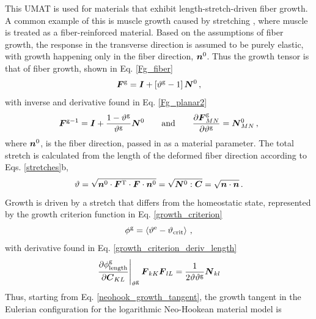 \documentclass[10pt,letterpaper,oneside]{report}
\newcommand{\ten}[1]{\mbox{\boldmath $#1$}{}}
\newcommand{\scas}[1]{\mbox{{\scriptsize{${\rm{#1}}$}}}{}}
\begin{document}
This UMAT is used for materials that exhibit length-stretch-driven fiber growth.  A common example of this is muscle growth caused by stretching \cite{Zollner2012}, where muscle is treated as a fiber-reinforced material.  Based on the assumptions of fiber growth, the response in the transverse direction is assumed to be purely elastic, with growth happening only in the fiber direction, $\ten{n}^0$.  Thus the growth tensor is that of fiber growth, shown in Eq. \ref{Fg_fiber}
\begin{equation*}
\ten{F}^{\scas{g}} = \ten{I} + \left[ \vartheta^{\scas{g}} - 1 \right] \ten{N}^0 \, , 
\end{equation*}
with inverse and derivative found in Eq. \ref{Fg_planar2}
\begin{equation*}
\ten{F}^{\scas{g}-1} = \ten{I} + \frac{1 - \vartheta^{\scas{g}}}{\vartheta^{\scas{g}}} \ten{N}^0 
\qquad \mbox{and} \qquad
\frac{\partial \ten{F}^{\scas{g}}_{MN} }{\partial \vartheta^{\scas{g}}} = \ten{N}^0_{MN} \, , 
\end{equation*}
where $\ten{n}^0$, is the fiber direction, passed in as a material parameter.  
The total stretch is calculated from the length of the deformed fiber direction according to Eqs. \ref{stretches}b, 
\begin{equation*}
\vartheta = \sqrt{ \ten{n}^0 \cdot \ten{F}^{\scas{T}} \cdot \ten{F} \cdot \ten{n}^0} = \sqrt{ \ten{N}^0 : \ten{C} } = \sqrt{ \ten{n} \cdot \ten{n}} \, . 
\label{fiber_stretch}
\end{equation*}
Growth is driven by a stretch that differs from the homeostatic state, represented by the growth criterion function in Eq. \ref{growth_criterion}
\begin{equation*}
\phi^{\scas{g}} = \left\langle \vartheta^{\scas{e}} - \vartheta_{\scas{crit}} \right\rangle \, ,
\end{equation*}
with derivative found in Eq. \ref{growth_criterion_deriv_length}
\begin{equation*}
\left. \frac{ \partial \phi^{\scas{g}}_{\scas{length}} }{ \partial \ten{C}_{KL} } \right|_{\vartheta^{\scas{g}}} \ten{F}_{kK} \ten{F}_{lL} 
= \frac{1}{2 \vartheta \vartheta^{\scas{g}}} \ten{N}_{kl} 
\end{equation*}
Thus, starting from Eq. \ref{neohook_growth_tangent}, the growth tangent in the Eulerian configuration for the logarithmic Neo-Hookean material model is
\end{document}
